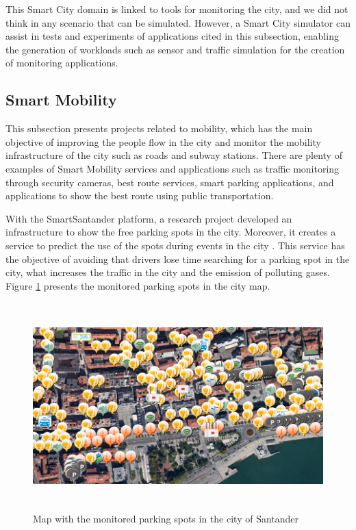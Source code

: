 This Smart City domain is linked to tools for monitoring the city, and we did not think in any scenario that can be simulated. However, a Smart City simulator can assist in tests and experiments of applications cited in this subsection, enabling the generation of workloads such as sensor and traffic simulation for the creation of monitoring applications.

\subsection{Smart Mobility}

This subsection presents projects related to mobility, which has the main objective of improving the people flow in the city and monitor the mobility infrastructure of the city such as roads and subway stations. There are plenty of examples of Smart Mobility services and applications such as traffic monitoring through security cameras, best route services, smart parking applications, and applications to show the best route using public transportation.

With the SmartSantander platform, a research project developed an infrastructure to show the free parking spots in the city. Moreover, it creates a service to predict the use of the spots during events in the city \citep{vlahogianni2014exploiting}. This service has the objective of avoiding that drivers lose time searching for a parking spot in the city, what increases the traffic in the city and the emission of polluting gases. Figure \ref{figure:smartsantandermap} presents the monitored parking spots in the city map.

\begin{figure}[!htb]
\centering
\includegraphics[height=8cm]{figuras/smartsantandermap}
\caption{Map with the monitored parking spots in the city of Santander}
\label{figure:smartsantandermap}
\end{figure}


